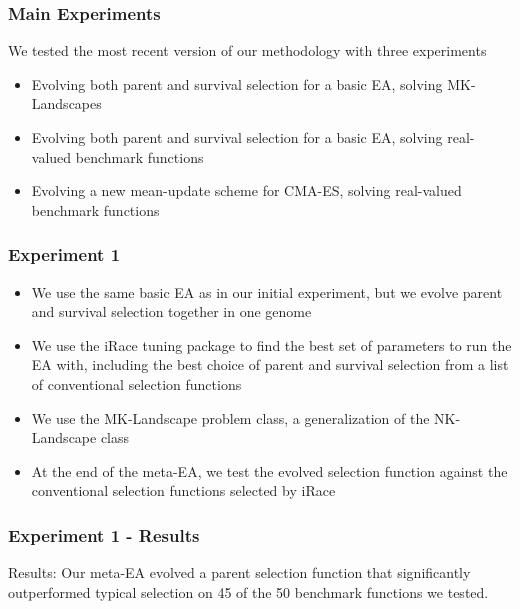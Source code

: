 \documentclass{beamer}
\begin{document}
 
	\begin{frame}
		\frametitle{Main Experiments}
		We tested the most recent version of our methodology with three experiments
		\begin{itemize}
			 \item<2-|alert@2> Evolving both parent and survival selection for a basic EA, solving MK-Landscapes
			 \item<3-|alert@3> Evolving both parent and survival selection for a basic EA, solving real-valued benchmark functions
			 \item<4-|alert@4> Evolving a new mean-update scheme for CMA-ES, solving real-valued benchmark functions
		\end{itemize}
	\end{frame}	 
 
 
	\begin{frame}
		\frametitle{Experiment 1}
		
		\begin{itemize}
			 \item<1-|alert@1> We use the same basic EA as in our initial experiment, but we evolve parent and survival selection together in one genome
			 \item<2-|alert@2> We use the iRace tuning package to find the best set of parameters to run the EA with, including the best choice of parent and survival selection from a list of conventional selection functions
			 \item<3-|alert@3> We use the MK-Landscape problem class, a generalization of the NK-Landscape class			 
			 \item<4-|alert@4> At the end of the meta-EA, we test the evolved selection function against the conventional selection functions selected by iRace
		\end{itemize}
	\end{frame} 
	
	\begin{frame}
		\frametitle{Experiment 1 - Results}
		Results: Our meta-EA evolved a parent selection function that significantly outperformed typical selection on 45 of the 50 benchmark functions we tested.
	\end{frame} 
	
\end{document}
